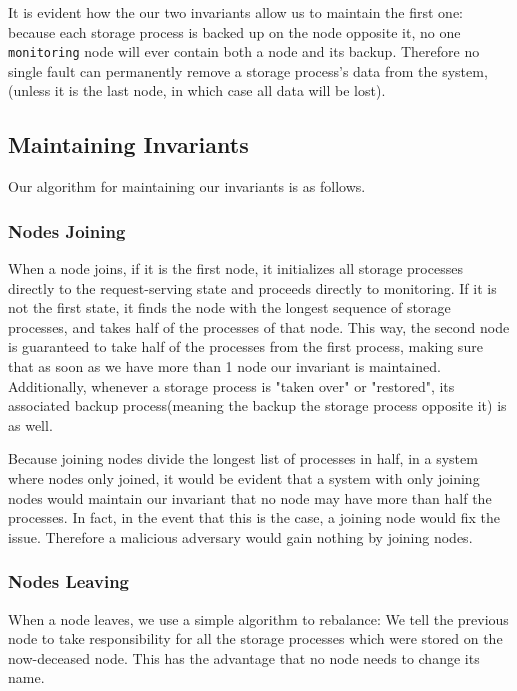 \documentclass[a4paper]{article}
\begin{document}
It is evident how the our two invariants allow us to maintain the first one: because each storage process is backed up on the node opposite it, no one {\tt monitoring} node will ever contain both a node and its backup. Therefore no single fault can permanently remove a storage process's data from the system, (unless it is the last node, in which case all data will be lost).

\subsection{Maintaining Invariants}

Our algorithm for maintaining our invariants is as follows.

\subsubsection{Nodes Joining}

When a node joins, if it is the first node, it initializes all storage processes directly to the request-serving state and proceeds directly to monitoring. If it is not the first state, it finds the node with the longest sequence of storage processes, and takes half of the processes of that node. This way, the second node is guaranteed to take half of the processes from the first process, making sure that as soon as we have more than 1 node our invariant is maintained. Additionally, whenever a storage process is "taken over" or "restored", its associated backup process(meaning the backup the storage process opposite it) is as well.

Because joining nodes divide the longest list of processes in half, in a system where nodes only joined, it would be evident that a system with only joining nodes would maintain our invariant that no node may have more than half the processes. In fact, in the event that this is the case, a joining node would fix the issue. Therefore a malicious adversary would gain nothing by joining nodes.

\subsubsection{Nodes Leaving}

When a node leaves, we use a simple algorithm to rebalance: We tell the previous node to take responsibility for all the storage processes which were stored on the now-deceased node. This has the advantage that no node needs to change its name.
\end{document}
